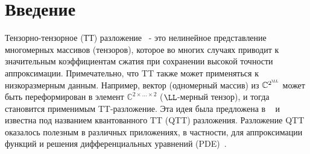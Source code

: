 \section{Введение}

Тензорно-тензорное (ТТ) разложение~\cite{osel-tt-2011} - это нелинейное представление многомерных массивов (тензоров), которое во многих случаях приводит к значительным коэффициентам сжатия при сохранении высокой точности аппроксимации.
Примечательно, что TT также может применяться к низкоразмерным данным.
Например, вектор (одномерный массив) из $\mathbb{C}^{2^\LL}$ может быть переформирован в элемент $\mathbb{C}^{2 \times \dots \times 2}$ ($\LL$-мерный тензор), и тогда становится применимым TT-разложение.
Эта идея была предложена в ~\cite{osel-2d2d-2010,khor-qtt-2011} и известна под названием квантованного TT (QTT) разложения.
Разложение QTT оказалось полезным в различных приложениях, в частности, для аппроксимации функций и решения дифференциальных уравнений (PDE)~\cite{khoromskij2018tensor}.

